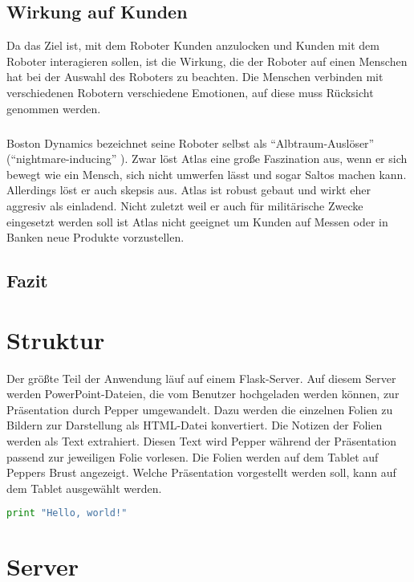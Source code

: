 \subsection{Wirkung auf Kunden}
Da das Ziel ist, mit dem Roboter Kunden anzulocken und Kunden mit dem Roboter
interagieren sollen, ist die Wirkung, die der Roboter auf einen Menschen hat bei
der Auswahl des Roboters zu beachten. Die Menschen verbinden mit verschiedenen
Robotern verschiedene Emotionen, auf diese muss Rücksicht genommen werden.

\subparagraph{}
Boston Dynamics bezeichnet seine Roboter selbst als "`Albtraum-Auslöser"'
("`nightmare-inducing"' \cite{Guardian2018}). Zwar löst Atlas eine große
Faszination aus, wenn er sich bewegt wie ein Mensch, sich nicht umwerfen lässt
und sogar Saltos machen kann. Allerdings löst er auch skepsis aus. Atlas ist
robust gebaut und wirkt eher aggresiv als einladend. Nicht zuletzt weil er auch
für militärische Zwecke eingesetzt werden soll ist Atlas nicht geeignet um
Kunden auf Messen oder in Banken neue Produkte vorzustellen.

\subparagraph{}

\subsection{Fazit}

\section{Struktur}\label{sec:struktur}
Der größte Teil der Anwendung läuf auf einem Flask-Server. Auf diesem Server
werden PowerPoint-Dateien, die vom Benutzer hochgeladen werden können, zur
Präsentation durch Pepper umgewandelt. Dazu werden die einzelnen Folien zu
Bildern zur Darstellung als HTML-Datei konvertiert. Die Notizen der Folien
werden als Text extrahiert. Diesen Text wird Pepper während der Präsentation
passend zur jeweiligen Folie vorlesen. Die Folien werden auf dem Tablet auf
Peppers Brust angezeigt. Welche Präsentation vorgestellt werden soll, kann auf
dem Tablet ausgewählt werden.

\begin{lstlisting}[float, language=Python, frame=single, framexleftmargin=15pt,
style=algoBericht, label={lst:vorlage}, captionpos=b, caption={Vorlage für das
Einfügen von Code-Beispielen}]
print "Hello, world!"
\end{lstlisting}

\section{Server}\label{sec:server}
